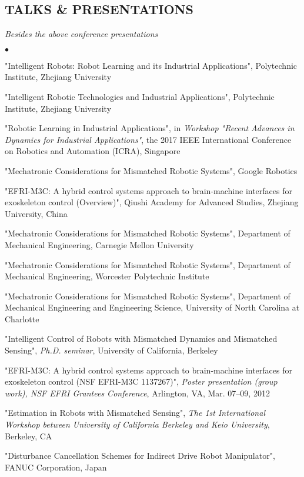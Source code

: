 \documentclass[UTF8,fontset=none]{res}
\begin{document}
\begin{resume}
\section{TALKS \& PRESENTATIONS}
{\it Besides the above conference presentations}
\vspace{0.05in}
\begin{list}{$\bullet$}{\setlength\leftmargin{0in}\setlength\topsep{0in}}
\item {} "Intelligent Robots: Robot Learning and its Industrial Applications", Polytechnic Institute, Zhejiang University
\item {} "Intelligent Robotic Technologies and Industrial Applications", Polytechnic Institute, Zhejiang University
\item {} "Robotic Learning in Industrial Applications", in \emph{Workshop "Recent Advances in Dynamics for Industrial Applications"}, the 2017 IEEE International Conference on Robotics and Automation (ICRA), Singapore
\item {} "Mechatronic Considerations for Mismatched Robotic Systems", Google Robotics
\item {} "EFRI-M3C: A hybrid control systems approach to brain-machine interfaces for exoskeleton control (Overview)", Qiushi Academy for Advanced Studies, Zhejiang University, China
\item {} "Mechatronic Considerations for Mismatched Robotic Systems", Department of Mechanical Engineering, Carnegie Mellon University
\item {} "Mechatronic Considerations for Mismatched Robotic Systems", Department of Mechanical Engineering, Worcester Polytechnic Institute
\item {} "Mechatronic Considerations for Mismatched Robotic Systems", Department of Mechanical Engineering and Engineering Science, University of North Carolina at Charlotte
\item {} "Intelligent Control of Robots with Mismatched Dynamics and Mismatched Sensing", \emph{Ph.D. seminar}, University of California, Berkeley
\item {} "EFRI-M3C: A hybrid control systems approach to brain-machine interfaces for exoskeleton control (NSF EFRI-M3C 1137267)", \emph{Poster presentation (group work), NSF EFRI Grantees Conference}, Arlington, VA, Mar. 07--09, 2012
\item {} "Estimation in Robots with Mismatched Sensing", \emph{The 1st International Workshop between University of California Berkeley and Keio University}, Berkeley, CA
\item {} "Disturbance Cancellation Schemes for Indirect Drive Robot Manipulator", FANUC Corporation, Japan
\end{list}


\end{resume}
\end{document}
